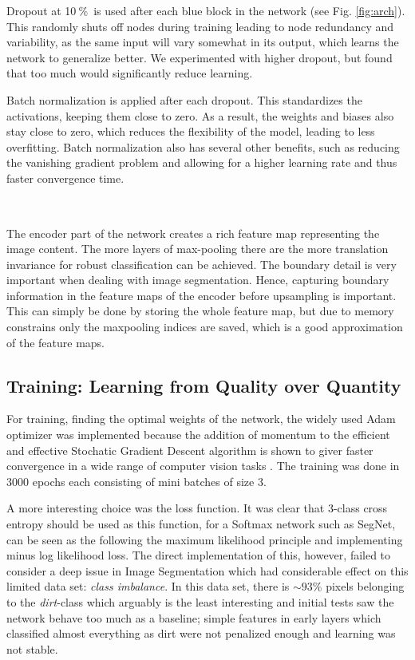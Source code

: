 \documentclass{article}
\newcommand{\pro}{\ensuremath{\ \%}}
\begin{document}
Dropout at 10\pro\ is used after each blue block in the network (see Fig. \ref{fig:arch}).
This randomly shuts off nodes during training leading to node redundancy and variability, as the same input will vary somewhat in its output, which learns the network to generalize better.
We experimented with higher dropout, but found that too much would significantly reduce learning.

Batch normalization is applied after each dropout.
This standardizes the activations, keeping them close to zero.
As a result, the weights and biases also stay close to zero, which reduces the flexibility of the model, leading to less overfitting.
Batch normalization also has several other benefits, such as reducing the vanishing gradient problem and allowing for a higher learning rate and thus faster convergence time. \cite{bn}
\\
\\
\subsection{}
The encoder part of the network creates a rich feature map representing the image content. The more 
layers of max-pooling there are the more translation invariance for robust 
classification can be achieved. The boundary detail is very important when 
dealing with image segmentation. Hence, capturing boundary information in 
the feature maps of the encoder before upsampling is important. This can 
simply be done by storing the whole feature map, but due to memory 
constrains only the maxpooling indices are saved, which is a good 
approximation of the feature maps. 
\subsection{Training: Learning from Quality over Quantity}
For training, finding the optimal weights of the network, the widely used Adam optimizer  was implemented because the addition of momentum to the efficient and effective Stochatic Gradient Descent algorithm is shown to giver faster convergence in a wide range of computer vision tasks \cite{Adam}. The training was done in 3000 epochs each consisting of mini batches of size 3.

A more interesting choice was the loss function. It was clear that 3-class cross entropy should be used as this function, for a Softmax network such as SegNet, can be seen as the following the maximum likelihood principle and implementing minus log likelihood loss. The direct implementation of this, however, failed to consider a deep issue in Image Segmentation which had considerable effect on this limited data set: \textit{class imbalance}. 
In this data set, there is \(\sim 93 \%\) pixels belonging to the \textit{dirt}-class which arguably is the least interesting and initial tests saw the network behave too much as a baseline; simple features in early layers which classified almost everything as dirt were not penalized enough and learning was not stable. 
\end{document}
